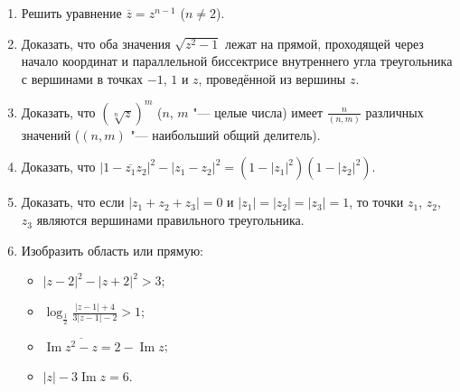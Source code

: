 \documentclass{article}
\providecommand{\abs}[1]{\left\lvert#1\right\rvert}
\newcommand{\theIm}{\operatorname{Im}}
\newcommand{\conj}[1]{\overline{#1}}
\begin{document}
\begin{enumerate}
    \item Решить уравнение $\conj{z} = z^{n-1}$ ($n \neq 2$).
    \item Доказать, что оба значения $\sqrt{z^2-1}$ лежат на прямой, проходящей через начало координат и параллельной биссектрисе внутреннего угла треугольника с вершинами в точках $-1$, $1$ и $z$, проведённой из вершины $z$.
    \item Доказать, что $(\sqrt[n]{z})^m$ ($n$, $m$ "--- целые числа) имеет $\frac{n}{(n, m)}$ различных значений ($(n, m)$ "--- наибольший общий делитель).
    \item Доказать, что $\abs{1 - \conj{z_1} z_2}^2 - \abs{z_1 - z_2}^2 = (1 - \abs{z_1}^2)(1 - \abs{z_2}^2)$.
    \item Доказать, что если $\abs{z_1 + z_2 + z_3} = 0$ и $\abs{z_1} = \abs{z_2} = \abs{z_3} = 1$, то точки $z_1$, $z_2$, $z_3$ являются вершинами правильного треугольника.
    \item Изобразить область или прямую: 
        \begin{itemize}
            \everymath{\displaystyle} %
            \item $\abs{z-2}^2 - \abs{z+2}^2 > 3$;
            \item $\log_{\frac{1}{2}} \frac{\abs{z - 1} + 4}{3 \abs{z - 1} - 2} > 1$;
            \item $\theIm \conj{z^2-z} = 2 - \theIm z$;
            \item $\abs{z} - 3 \theIm z = 6$.
            \everymath{\textstyle}
        \end{itemize}
\end{enumerate}
\end{document}
